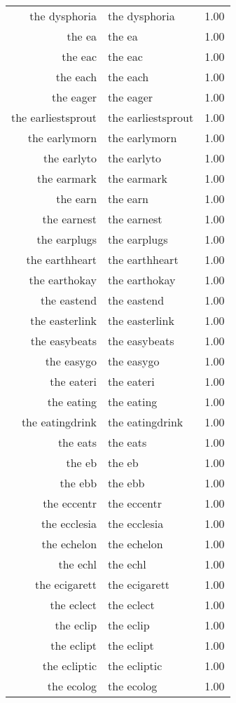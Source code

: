 \begin{table}[ht]
\begin{tabular}{rlr}
  the dysphoria & the dysphoria & 1.00 \\ 
  the ea & the ea & 1.00 \\ 
  the eac & the eac & 1.00 \\ 
  the each & the each & 1.00 \\ 
  the eager & the eager & 1.00 \\ 
  the earliestsprout & the earliestsprout & 1.00 \\ 
  the earlymorn & the earlymorn & 1.00 \\ 
  the earlyto & the earlyto & 1.00 \\ 
  the earmark & the earmark & 1.00 \\ 
  the earn & the earn & 1.00 \\ 
  the earnest & the earnest & 1.00 \\ 
  the earplugs & the earplugs & 1.00 \\ 
  the earthheart & the earthheart & 1.00 \\ 
  the earthokay & the earthokay & 1.00 \\ 
  the eastend & the eastend & 1.00 \\ 
  the easterlink & the easterlink & 1.00 \\ 
  the easybeats & the easybeats & 1.00 \\ 
  the easygo & the easygo & 1.00 \\ 
  the eateri & the eateri & 1.00 \\ 
  the eating & the eating & 1.00 \\ 
  the eatingdrink & the eatingdrink & 1.00 \\ 
  the eats & the eats & 1.00 \\ 
  the eb & the eb & 1.00 \\ 
  the ebb & the ebb & 1.00 \\ 
  the eccentr & the eccentr & 1.00 \\ 
  the ecclesia & the ecclesia & 1.00 \\ 
  the echelon & the echelon & 1.00 \\ 
  the echl & the echl & 1.00 \\ 
  the ecigarett & the ecigarett & 1.00 \\ 
  the eclect & the eclect & 1.00 \\ 
  the eclip & the eclip & 1.00 \\ 
  the eclipt & the eclipt & 1.00 \\ 
  the ecliptic & the ecliptic & 1.00 \\ 
  the ecolog & the ecolog & 1.00 \\ 

\end{tabular}
\end{table}
